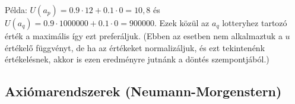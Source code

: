 \documentclass[a4paper,12pt]{article}
\begin{document}

Példa: $U(a_p)= 0.9\cdot 12 + 0.1\cdot 0 = 10,8$ és $U(a_q)= 0.9\cdot 1000000 + 0.1\cdot 0 = 900000$. Ezek közül az $a_q$ lotteryhez tartozó érték a maximális így ezt preferáljuk. (Ebben az esetben nem alkalmaztuk a $u$ értékelő függvényt, de ha az értékeket normalizáljuk, és ezt tekintenénk értékelésnek, akkor is ezen eredményre jutnánk a döntés szempontjából.)

\subsection{Axiómarendszerek (Neumann-Morgenstern)} 



\end{document}
